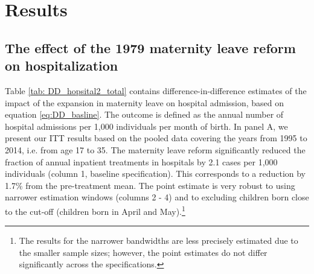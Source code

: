\documentclass[11pt, a4paper]{article} %
\begin{document}
\section{Results}\label{sec:results}

\subsection[The effect on hospital admission]{The effect of the 1979 maternity leave reform on hospitalization}


Table \ref{tab: DD_hopsital2_total} contains difference-in-difference estimates of the impact of the expansion in maternity leave on hospital admission, based on equation \ref{eq:DD_basline}. The outcome is defined as the annual number of hospital admissions per 1,000 individuals per month of birth. In panel A, we present our ITT results based on the pooled data covering the years from 1995 to 2014, i.e. from age 17 to 35. The maternity leave reform significantly reduced the fraction of annual inpatient treatments in hospitals by 2.1 cases per 1,000 individuals (column 1, baseline specification). This corresponds to a reduction by 1.7\% from the pre-treatment mean.  The point estimate is very robust to using narrower estimation windows (columns 2 - 4) and to excluding children born close to the cut-off (children born in April and May).\footnote{The results for the narrower bandwidths are less precisely estimated due to the smaller sample sizes; however, the point estimates do not differ significantly across the specifications.} 
\newline     
\end{document}
